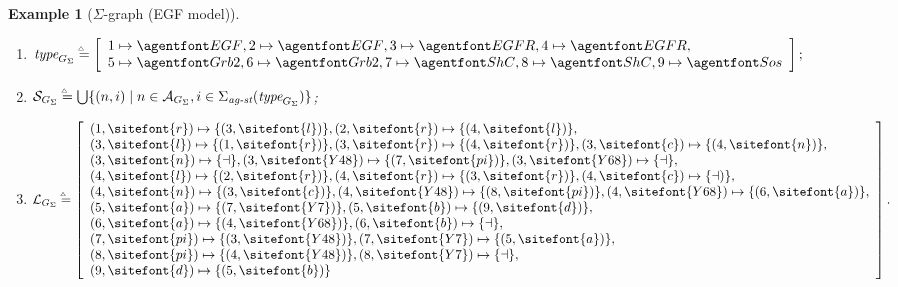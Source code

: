 \documentclass{entcs}
\newcommand{\map}[2]{#2}
\newcommand{\freesymbol}{\dashv}
\newcommand{\graphsymb}{G}
\newcommand{\linksite}{\signaturesymb_{\textit{ag-st}}}
\newcommand{\signaturesymb}{\Sigma}
\newcommand{\bydef}{\stackrel{\scalebox{0.8}{\!\!$\scriptscriptstyle{\triangle}$}}{=}}
\newcommand{\agents}[1][\graphsymb]{\mathcal{A}_{#1}}
\newcommand{\type}[1][\graphsymb]{\textit{type}_{#1}}
\newcommand{\sites}[1][\graphsymb]{\mathcal{S}_{#1}}
\newcommand{\links}[1][\graphsymb]{\mathcal{L}_{#1}}
\newtheorem{myexample}[thm]{Example}
\begin{document}
\begin{myexample}[$\Sigma$-graph (EGF model)]
\begin{enumerate}
  \item $\type[\graphsymb_{\Sigma}]\bydef \map{\begin{cases}\begin{array}{ccc}%
  1 &\mapsto&\agent{EGF}{}\cr%
  2 &\mapsto&\agent{EGF}{}\cr%
  3 &\mapsto&\agent{EGFR}{}\cr%
  4 &\mapsto&\agent{EGFR}{}\cr%
  5 &\mapsto&\agent{Grb2}{}\cr%
  6 &\mapsto&\agent{Grb2}{}\cr%
  7 &\mapsto&\agent{ShC}{}\cr%
  8 &\mapsto&\agent{ShC}{}\cr%
  9 &\mapsto&\agent{Sos}{}.
\end{array}\end{cases}}{\left[\begin{array}{l}1 \mapsto \agent{EGF}{}, 2 \mapsto \agent{EGF}{}, 3 \mapsto \agent{EGFR}{}, 4 \mapsto \agent{EGFR}{}, \cr 5 \mapsto \agent{Grb2}{}, 6 \mapsto \agent{Grb2}{}, 7 \mapsto \agent{ShC}{}, 8 \mapsto \agent{ShC}{},
9 \mapsto \agent{Sos}{}\end{array}\right];}$
  \item $\sites[\graphsymb_\Sigma]\bydef
\bigcup \{(n,i)\;|\; n\in \agents[\graphsymb_\Sigma],
i\in\linksite(\type[\graphsymb_{\Sigma}])\}$;
  \item $\links[\graphsymb_{\Sigma}]\bydef\map{}{\left[%
  \begin{array}{l}
    (1,\sitefont{r})\mapsto\{(3,\sitefont{l})\},
    (2,\sitefont{r})\mapsto\{(4,\sitefont{l})\},\cr
    (3,\sitefont{l})\mapsto \{(1,\sitefont{r})\},
    (3,\sitefont{r})\mapsto \{(4,\sitefont{r})\},
    (3,\sitefont{c})\mapsto \{(4,\sitefont{n})\},\cr
    (3,\sitefont{n})\mapsto \{\freesymbol\},
    (3,\sitefont{Y48})\mapsto \{(7,\sitefont{pi})\},
    (3,\sitefont{Y68})\mapsto \{\freesymbol\},\cr
    (4,\sitefont{l})\mapsto \{(2,\sitefont{r})\},
    (4,\sitefont{r})\mapsto \{(3,\sitefont{r})\},
    (4,\sitefont{c})\mapsto \{\freesymbol)\},\cr
    (4,\sitefont{n})\mapsto \{(3,\sitefont{c})\},
    (4,\sitefont{Y48})\mapsto \{(8,\sitefont{pi})\},
    (4,\sitefont{Y68})\mapsto \{(6,\sitefont{a})\},\cr
    (5,\sitefont{a})\mapsto \{(7,\sitefont{Y7})\},
    (5,\sitefont{b})\mapsto \{(9,\sitefont{d})\},\cr
    (6,\sitefont{a})\mapsto \{(4,\sitefont{Y68})\},
    (6,\sitefont{b})\mapsto \{\freesymbol\},\cr
    (7,\sitefont{pi})\mapsto \{(3,\sitefont{Y48})\},
    (7,\sitefont{Y7})\mapsto \{(5,\sitefont{a})\},\cr
    (8,\sitefont{pi})\mapsto \{(4,\sitefont{Y48})\},
    (8,\sitefont{Y7})\mapsto \{\freesymbol\},\cr
(9,\sitefont{d}) \mapsto \{(5,\sitefont{b})\}
  \end{array}\right]}.$
\end{enumerate}
\end{myexample}
\end{document}
